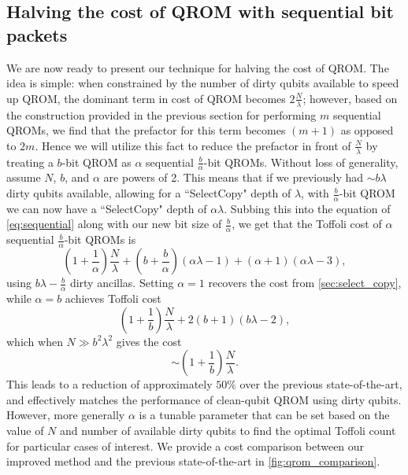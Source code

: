 \documentclass[a4paper, amsfonts, amssymb, amsmath, reprint, showkeys, twoside,superscriptaddress, onecolumn, nofootinbib]{revtex4-2}
\begin{document}
\subsection{Halving the cost of QROM with sequential bit packets} \label{sec:halving_qrom}
We are now ready to present our technique for halving the cost of QROM. The idea is simple: when constrained by the number of dirty qubits available to speed up QROM, the dominant term in cost of QROM becomes $2\frac{N}{\lambda}$; however, based on the construction provided in the previous section for performing $m$ sequential QROMs, we find that the prefactor for this term becomes $(m+1)$ as opposed to $2m$. Hence we will utilize this fact to reduce the prefactor in front of $\frac{N}{\lambda}$ by treating a $b$-bit QROM as $\alpha$ sequential $\frac{b}{\alpha}$-bit QROMs. Without loss of generality, assume $N$, $b$, and $\alpha$ are powers of 2. This means that if we previously had $\sim b\lambda$ dirty qubits available, allowing for a ``SelectCopy" depth of $\lambda$, with $\frac{b}{\alpha}$-bit QROM we can now have a ``SelectCopy" depth of $\alpha\lambda$. Subbing this into the equation of \cref{eq:sequential} along with our new bit size of $\frac{b}{\alpha}$, we get that the Toffoli cost of $\alpha$ sequential $\frac{b}{\alpha}$-bit QROMs is
\begin{equation}\label{eq:bit_batch_load}
    (1+\frac{1}{\alpha})\frac{N}{\lambda} + (b+\frac{b}{\alpha})(\alpha\lambda - 1) + (\alpha+1)(\alpha\lambda-3),
\end{equation}
using $b\lambda - \frac{b}{\alpha}$ dirty ancillas. Setting $\alpha = 1$ recovers the cost from \cref{sec:select_copy}, while $\alpha = b$ achieves Toffoli cost
\begin{equation}
    (1+\frac{1}{b})\frac{N}{\lambda} + 2(b+1)(b\lambda - 2),
\end{equation}
which when $N \gg b^2 \lambda^2$ gives the cost
\begin{equation}
    \sim(1+\frac{1}{b})\frac{N}{\lambda}.
\end{equation}
This leads to a reduction of approximately $50\%$  over the previous state-of-the-art, and effectively matches the performance of clean-qubit QROM using dirty qubits. However, more generally $\alpha$ is a tunable parameter that can be set based on the value of $N$ and number of available dirty qubits to find the optimal Toffoli count for particular cases of interest. We provide a cost comparison between our improved method and the previous state-of-the-art in \cref{fig:qrom_comparison}.\\
\end{document}
